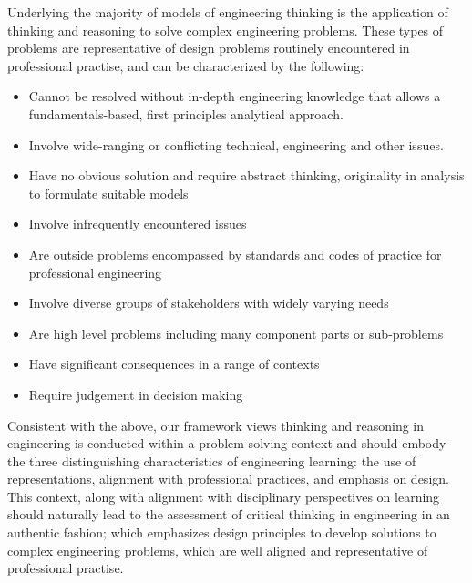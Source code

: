 Underlying the majority of models of engineering thinking is the application of thinking and reasoning to solve complex engineering problems. These types of problems are representative of design problems routinely encountered in professional practise, and can be characterized by the following\cite{internationalengineeringalliance}: 

\begin{itemize}
\item Cannot be resolved without in-depth engineering knowledge that allows a fundamentals-based, first principles analytical approach.
\item Involve wide-ranging or conflicting technical, engineering and other issues.
\item Have no obvious solution and require abstract thinking, originality in analysis to formulate suitable models
\item Involve infrequently encountered issues
\item Are outside problems encompassed by standards and codes of practice for professional engineering
\item Involve diverse groups of stakeholders with widely varying needs
\item Are high level problems including many component parts or sub-problems
\item Have significant consequences in a range of contexts
\item Require judgement in decision making
\end{itemize}

Consistent with the above, our framework views thinking and reasoning in engineering is conducted within a problem solving context and should embody the three distinguishing characteristics of engineering learning: the use of representations, alignment with professional practices, and emphasis on design\cite{Johri:2014tk}. This context, along with alignment with disciplinary perspectives on learning should naturally lead to the assessment of critical thinking in engineering in an authentic fashion; which emphasizes design principles to develop solutions to  complex engineering problems, which are well aligned and representative of professional practise.
